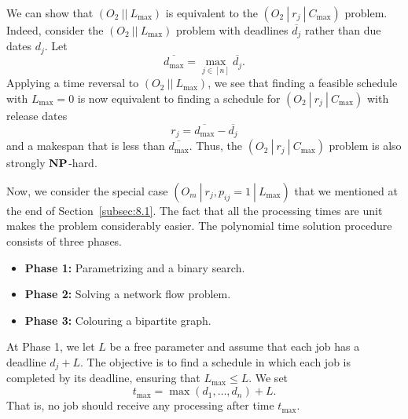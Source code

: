 We can show that $(O_2~||~L_{\max})$ is equivalent to the 
$(O_2~|~r_j~|~C_{\max})$ problem. Indeed, consider the $(O_2~||~L_{\max})$ 
problem with deadlines $\overline{d_j}$ rather than due dates $d_j$. 
Let 
\[ \overline{d_{\max}} = \max_{j\in [n]} \overline{d_j}. \] 
Applying a time reversal to $(O_2~||~L_{\max})$, we see that finding a 
feasible schedule with $L_{\max} = 0$ is now equivalent to finding 
a schedule for $(O_2~|~r_j~|~C_{\max})$ with release dates 
\[ r_j = \overline{d_{\max}} - \overline{d_j} \] 
and a makespan that is less than $\overline{d_{\max}}$. Thus, the 
$(O_2~|~r_j~|~C_{\max})$ problem is also strongly $\operatorname{\textbf{NP}}$-hard. 

Now, we consider the special case $(O_m~|~r_j, p_{ij} = 1~|~L_{\max})$ 
that we mentioned at the end of Section~\ref{subsec:8.1}. The fact that 
all the processing times are unit makes the problem considerably easier. 
The polynomial time solution procedure consists of three phases. 
\begin{itemize}
    \item {\bf Phase 1:} Parametrizing and a binary search. 
    \item {\bf Phase 2:} Solving a network flow problem. 
    \item {\bf Phase 3:} Colouring a bipartite graph.  
\end{itemize}
At Phase 1, we let $L$ be a free parameter and assume that each job has a 
deadline $d_j + L$. The objective is to find a schedule in which each job 
is completed by its deadline, ensuring that $L_{\max} \leq L$. We set 
\[ t_{\max} = \max(d_1, \dots, d_n) + L. \] 
That is, no job should receive any processing after time $t_{\max}$. 

